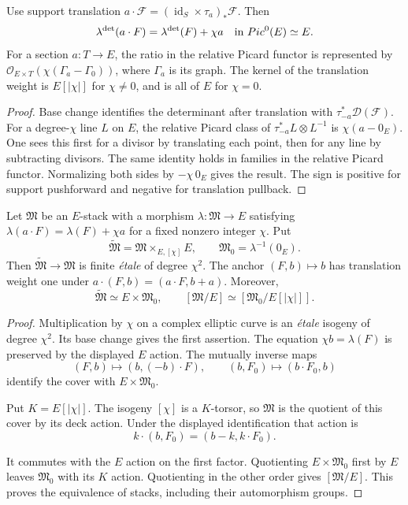 \begin{proposition}
\label{prop:determinant-anchor-translation-weight}
Use support translation
$a\cdot\mathcal F=(\operatorname{id}_S\times\tau_a)_*\mathcal F$.
Then
\[
\lambda^{\det}(a\cdot F)
=\lambda^{\det}(F)+\chi a
\quad\text{in }Pic^0(E)\simeq E.
\]
For a section $a:T\to E$, the ratio in the relative Picard functor
is represented by $\mathcal O_{E\times T}(\chi(\Gamma_a-\Gamma_0))$, where
$\Gamma_a$ is its graph.  The kernel of the translation weight is
$E[|\chi|]$ for $\chi\ne0$, and is all of $E$ for $\chi=0$.
\end{proposition}

\begin{proof}
Base change identifies the determinant after translation with
$\tau_{-a}^*\mathscr D(\mathcal F)$.
For a degree-$\chi$ line $L$ on $E$, the relative Picard class of
$\tau_{-a}^*L\otimes L^{-1}$ is $\chi(a-0_E)$.
One sees this first for a divisor by translating each point, then
for any line by subtracting divisors.  The same identity holds in
families in the relative Picard functor.  Normalizing both sides by
$-\chi\,0_E$ gives the result.  The sign is positive for support
pushforward and negative for translation pullback.
\end{proof}

\begin{proposition}
\label{k3:prop:anchor-cover}
Let $\mathfrak M$ be an $E$-stack with a morphism
$\lambda:\mathfrak M\to E$ satisfying
$\lambda(a\cdot F)=\lambda(F)+\chi a$ for a fixed nonzero integer
$\chi$.  Put
\[
\widetilde{\mathfrak M}
=\mathfrak M\mathbin{\times}_{E,[\chi]}E,
\qquad \mathfrak M_0=\lambda^{-1}(0_E).
\]
Then $\widetilde{\mathfrak M}\to\mathfrak M$ is finite \emph{\'etale}
of degree $\chi^2$.  The anchor $(F,b)\mapsto b$ has translation
weight one under $a\cdot(F,b)=(a\cdot F,b+a)$.  Moreover,
\[
\widetilde{\mathfrak M}\simeq E\times\mathfrak M_0,
\qquad
[\mathfrak M/E]\simeq[\mathfrak M_0/E[|\chi|]].
\]
\end{proposition}

\begin{proof}
Multiplication by $\chi$ on a complex elliptic curve is an \emph{\'etale}
isogeny of degree $\chi^2$.  Its base change gives the first assertion.
The equation $\chi b=\lambda(F)$ is preserved by the displayed
$E$ action.  The mutually inverse maps
\[
(F,b)\longmapsto (b,(-b)\cdot F),
\qquad (b,F_0)\longmapsto(b\cdot F_0,b)
\]
identify the cover with $E\times\mathfrak M_0$.

Put $K=E[|\chi|]$.  The isogeny $[\chi]$ is a $K$-torsor, so
$\mathfrak M$ is the quotient of this cover by its deck action.
Under the displayed identification that action is
\[
k\cdot(b,F_0)=(b-k,k\cdot F_0).
\]

It commutes with the $E$ action on the first factor.  Quotienting
$E\times\mathfrak M_0$ first by $E$ leaves $\mathfrak M_0$ with
its $K$ action.  Quotienting in the other order gives
$[\mathfrak M/E]$.  This proves the equivalence of stacks, including
their automorphism groups.
\end{proof}

